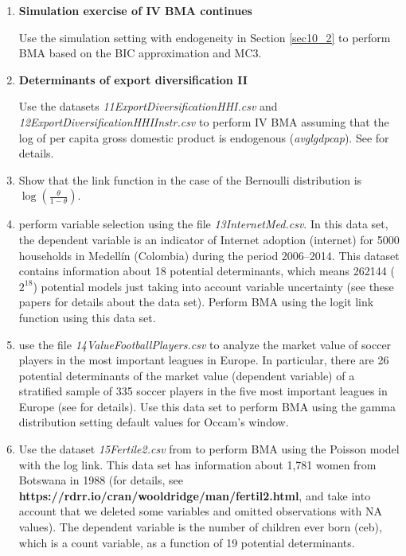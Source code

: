 \begin{enumerate}
\item \textbf{Simulation exercise of IV BMA continues}

Use the simulation setting with endogeneity in Section \ref{sec10_2} to perform BMA based on the BIC approximation and MC3.

\item \textbf{Determinants of export diversification II}

Use the datasets \textit{11ExportDiversificationHHI.csv} and \textit{12ExportDiversificationHHIInstr.csv} to perform IV BMA assuming that the log of per capita gross domestic product is endogenous (\textit{avglgdpcap}). See \cite{Jetter2015} for details.

\item Show that the link function in the case of the Bernoulli distribution is $\log\left(\frac{\theta}{1-\theta}\right)$.

\item \cite{ramirez2020dynamic,ramirez2021specification} perform variable selection using the file \textit{13InternetMed.csv}. In this data set, the dependent variable is an indicator of Internet adoption (internet) for 5000 households in Medell\'in (Colombia) during the period 2006--2014. This dataset contains information about 18 potential determinants, which means 262144 ($2^{18}$) potential models just taking into account variable uncertainty (see these papers for details about the data set). Perform BMA using the logit link function using this data set.  

\item \cite{Serna2018} use the file \textit{14ValueFootballPlayers.csv} to analyze the market value of soccer players in the most important leagues in Europe. In particular, there are 26 potential determinants of the market value (dependent variable) of a stratified sample of 335 soccer players in the five most important leagues in Europe (see \cite{Serna2018} for details). Use this data set to perform BMA using the gamma distribution setting default values for Occam's window.  

\item Use the dataset \textit{15Fertile2.csv} from \cite[p.~547]{Wooldridge2012} to perform BMA using the Poisson model with the log link. This data set has information about 1,781 women from Botswana in 1988 (for details, see \textbf{https://rdrr.io/cran/wooldridge/man/fertil2.html}, and take into account that we deleted some variables and omitted observations with NA values). The dependent variable is the number of children ever born (ceb), which is a count variable, as a function of 19 potential determinants.


\end{enumerate}
